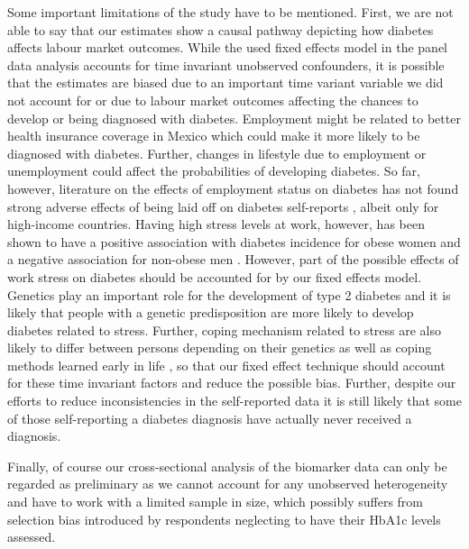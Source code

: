 Some important limitations of the study have to be mentioned. First,
we are not able to say that our estimates show a causal pathway depicting
how diabetes affects labour market outcomes. While the used fixed
effects model in the panel data analysis accounts for time invariant
unobserved confounders, it is possible that the estimates are biased
due to an important time variant variable we did not account for or
due to labour market outcomes affecting the chances to develop or
being diagnosed with diabetes. Employment might be related to better
health insurance coverage in Mexico which could make it more likely
to be diagnosed with diabetes. Further, changes in lifestyle due to
employment or unemployment could affect the probabilities of developing
diabetes. So far, however, literature on the effects of employment
status on diabetes has not found strong adverse effects of being laid
off on diabetes self-reports \citep{Bergemann2011,Schaller2014},
albeit only for high-income countries. Having high stress levels at
work, however, has been shown to have a positive association with
diabetes incidence for obese women and a negative association for
non-obese men \citep{Heraclides2012,Eriksson2013}. However, part
of the possible effects of work stress on diabetes should be accounted
for by our fixed effects model. Genetics play an important role for
the development of type 2 diabetes and it is likely that people with
a genetic predisposition are more likely to develop diabetes related
to stress. Further, coping mechanism related to stress are also likely
to differ between persons depending on their genetics as well as coping
methods learned early in life \citep{Schneiderman2005}, so that our
fixed effect technique should account for these time invariant factors
and reduce the possible bias. Further, despite our efforts to reduce inconsistencies in the self-reported
data it is still likely that some of those self-reporting a diabetes
diagnosis have actually never received a diagnosis.

Finally, of course our cross-sectional analysis of the biomarker data
can only be regarded as preliminary as we cannot account for any unobserved
heterogeneity and have to work with a limited sample in size, which
possibly suffers from selection bias introduced by respondents neglecting
to have their \ac{HbA1c} levels assessed.

